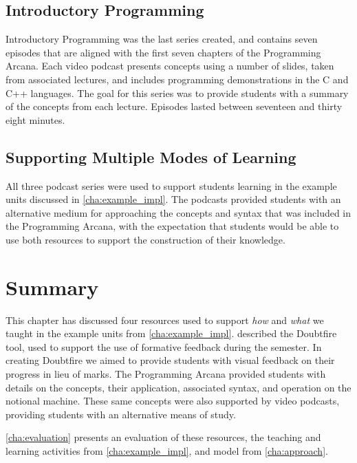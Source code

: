 
\subsection{Introductory Programming} %
\label{sub:introductory_programming}

Introductory Programming was the last series created, and contains seven episodes that are aligned with the first seven chapters of the Programming Arcana. Each video podcast presents concepts using a number of slides, taken from associated lectures, and includes programming demonstrations in the C and C++ languages. The goal for this series was to provide students with a summary of the concepts from each lecture. Episodes lasted between seventeen and thirty eight minutes.


\subsection{Supporting Multiple Modes of Learning} %
\label{sub:supporting_multiple_modes_of_learning}

All three podcast series were used to support students learning in the example units discussed in \cref{cha:example_impl}. The podcasts provided students with an alternative medium for approaching the concepts and syntax that was included in the Programming Arcana, with the expectation that students would be able to use both resources to support the construction of their knowledge.




\section{Summary} %
\label{sec:supporting_summary}

This chapter has discussed four resources used to support \emph{how} and \emph{what} we taught in the example units from \cref{cha:example_impl}.  described the Doubtfire tool, used to support the use of formative feedback during the semester. In creating Doubtfire we aimed to provide students with visual feedback on their progress in lieu of marks. The Programming Arcana provided students with details on the concepts, their application, associated syntax, and operation on the notional machine. These same concepts were also supported by video podcasts, providing students with an alternative means of study.

\cref{cha:evaluation} presents an evaluation of these resources, the teaching and learning activities from \cref{cha:example_impl}, and model from \cref{cha:approach}.



